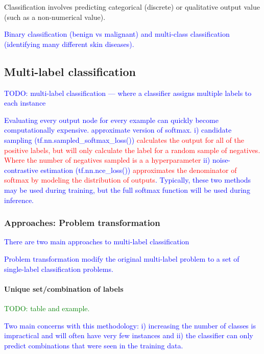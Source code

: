 Classification involves predicting categorical (discrete) or qualitative output value (such as a non-numerical value). 

\textcolor{blue}{Binary classification (benign vs malignant) and multi-class classification (identifying many different skin diseases).}

\subsection{Multi-label classification}
\textcolor{blue}{TODO: {multi-label classification} --- where a classifier assigns multiple labels to each instance}

\textcolor{blue}{Evaluating every output node for every example can quickly become computationally expensive. approximate version of softmax. i) candidate sampling (tf.nn.sampled\_softmax\_loss()) \textcolor{red}{calculates the output for all of the positive labels, but will only calculate the label for a random sample of negatives. Where the number of negatives sampled is a a hyperparameter} ii) noise-contrastive estimation (tf.nn.nce\_loss()) \textcolor{red}{approximates the denominator of softmax by modeling the distribution of outputs}. Typically, these two methods may be used during training, but the full softmax function will be used during inference.}


\subsubsection{Approaches: Problem transformation}

\textcolor{blue}{There are two main approaches to multi-label classification}

\textcolor{blue}{{Problem transformation} modify the original multi-label problem to a set of single-label classification problems.}

\paragraph{Unique set/combination of labels}

\textcolor{green}{TODO: table and example.}

\textcolor{blue}{Two main concerns with this methodology: i) increasing the number of classes is impractical and will often have very few instances and ii) the classifier can only predict combinations that were seen in the training data.}

